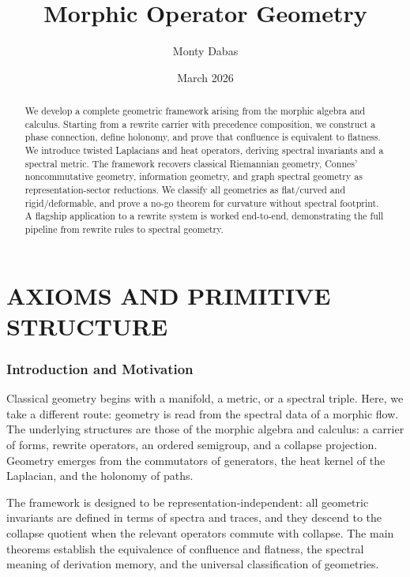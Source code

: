 \documentclass[12pt, oneside]{article}
\title{Morphic Operator Geometry}
\author{Monty Dabas}
\date{March 2026}
\begin{document}
\maketitle

\begin{abstract}
We develop a complete geometric framework arising from the morphic algebra and calculus. Starting from a rewrite carrier with precedence composition, we construct a phase connection, define holonomy, and prove that confluence is equivalent to flatness. We introduce twisted Laplacians and heat operators, deriving spectral invariants and a spectral metric. The framework recovers classical Riemannian geometry, Connes' noncommutative geometry, information geometry, and graph spectral geometry as representation-sector reductions. We classify all geometries as flat/curved and rigid/deformable, and prove a no-go theorem for curvature without spectral footprint. A flagship application to a rewrite system is worked end-to-end, demonstrating the full pipeline from rewrite rules to spectral geometry.
\end{abstract}

\tableofcontents

\newpage

\part{AXIOMS AND PRIMITIVE STRUCTURE}

\section{Introduction and Motivation}

Classical geometry begins with a manifold, a metric, or a spectral triple. Here, we take a different route: geometry is read from the spectral data of a morphic flow. The underlying structures are those of the morphic algebra and calculus: a carrier of forms, rewrite operators, an ordered semigroup, and a collapse projection. Geometry emerges from the commutators of generators, the heat kernel of the Laplacian, and the holonomy of paths.

The framework is designed to be representation-independent: all geometric invariants are defined in terms of spectra and traces, and they descend to the collapse quotient when the relevant operators commute with collapse. The main theorems establish the equivalence of confluence and flatness, the spectral meaning of derivation memory, and the universal classification of geometries.
\end{document}
